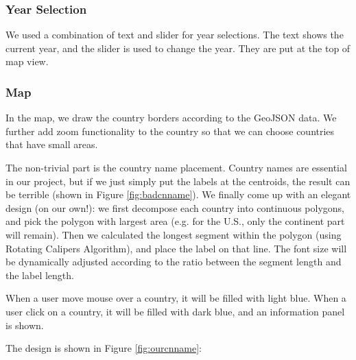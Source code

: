 \documentclass[12pt, fullpage,letterpaper]{article}
\begin{document}
\subsubsection{Year Selection}
We used a combination of text and slider for year selections.
The text shows the current year, and the slider is used to change the year.
They are put at the top of map view.

\subsubsection{Map}
In the map, we draw the country borders according to the GeoJSON data.
We further add zoom functionality to the country so that we can choose countries that have small areas.

The non-trivial part is the country name placement. Country names are essential in our project,
but if we just simply put the labels at the centroids, the result can be terrible (shown in Figure \ref{fig:badcnname}). We finally come up with an elegant
design (on our own!): we first decompose each country into continuous polygons, and pick the polygon with largest area (e.g. for the U.S., only the continent part will remain).
Then we calculated the longest segment within the polygon (using Rotating Calipers Algorithm), and place the label on that line.
The font size will be dynamically adjusted according to the ratio between the segment length and the label length.

When a user move mouse over a country, it will be filled with light blue. When a user click on a country, it will be filled with dark blue, and 
an information panel is shown.

The design is shown in Figure \ref{fig:ourcnname}:
\end{document}
